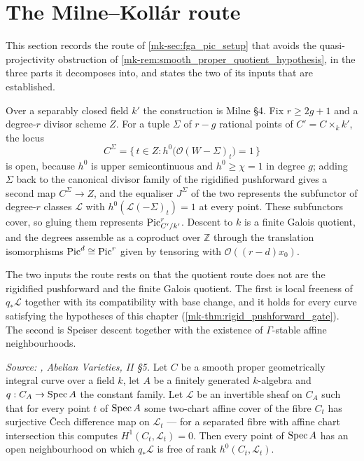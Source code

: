 \section{The Milne--Koll\'ar route}
\label{mk-sec:fga_pic_milne_kollar}

This section records the route of \ref{mk-sec:fga_pic_setup} that avoids the
quasi-projectivity obstruction of \ref{mk-rem:smooth_proper_quotient_hypothesis},
in the three parts it decomposes into, and states the two of its inputs that are
established.

Over a separably closed field \(k'\) the construction is Milne \S 4. Fix
\(r \ge 2g+1\) and a degree-\(r\) divisor scheme \(Z\). For a tuple \(\Sigma\) of
\(r-g\) rational points of \(C' = C \times_k k'\), the locus
\[
  C^\Sigma
    = \{\, t \in Z : h^0\bigl(\mathcal{O}(W - \Sigma)_t\bigr) = 1 \,\}
\]
is open, because \(h^0\) is upper semicontinuous and \(h^0 \ge \chi = 1\) in
degree \(g\); adding \(\Sigma\) back to the canonical divisor family of the
rigidified pushforward gives a second map \(C^\Sigma \to Z\), and the equaliser
\(J^\Sigma\) of the two represents the subfunctor of degree-\(r\) classes
\(\mathcal{L}\) with \(h^0(\mathcal{L}(-\Sigma)_t) = 1\) at every point. These
subfunctors cover, so gluing them represents \(\operatorname{Pic}^r_{C'/k'}\). Descent to
\(k\) is a finite Galois quotient, and the degrees assemble as a coproduct over
\(\mathbb{Z}\) through the translation isomorphisms
\(\operatorname{Pic}^d \cong \operatorname{Pic}^r\) given by tensoring with \(\mathcal{O}((r-d) x_0)\).

The two inputs the route rests on that the quotient route does not are the
rigidified pushforward and the finite Galois quotient. The first is local freeness
of \(q_* \mathcal{L}\) together with its compatibility with base change, and it
holds for every curve satisfying the hypotheses of this chapter
(\ref{mk-thm:rigid_pushforward_gate}). The second is Speiser descent together with
the existence of \(\Gamma\)-stable affine neighbourhoods.

\begin{theorem}\label{mk-thm:rigid_pushforward_locally_free}
  \leanok

  \textit{Source: \cite{mumford-av}, \emph{Abelian Varieties}, II \S 5.}
  Let \(C\) be a smooth proper geometrically integral curve over a field \(k\),
  let \(A\) be a finitely generated \(k\)-algebra and \(q : C_A \to \operatorname{Spec} A\) the
  constant family. Let \(\mathcal{L}\) be an invertible sheaf on \(C_A\) such that
  for every point \(t\) of \(\operatorname{Spec} A\) some two-chart affine cover of the fibre
  \(C_t\) has surjective {\v C}ech difference map on \(\mathcal{L}_t\) --- for a
  separated fibre with affine chart intersection this computes
  \(H^1(C_t, \mathcal{L}_t) = 0\). Then every point of \(\operatorname{Spec} A\) has an open
  neighbourhood on which \(q_* \mathcal{L}\) is free of rank
  \(h^0(C_t, \mathcal{L}_t)\).
\end{theorem}

